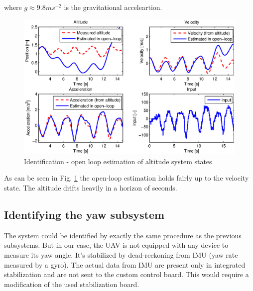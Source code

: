 where $g \approx 9.8 ms^{-2}$ is the gravitational acceleartion.

\begin{figure}[h]
\includegraphics[width=1\textwidth]{fig/iden4.eps} 
\caption{Identification - open loop estimation of altitude system states}
\label{fig:iden4}
\end{figure}

As can be seen in Fig. \ref{fig:iden4} the open-loop estimation holds fairly up to the velocity state. The altitude drifts heavily in a horizon of seconds. 

\subsection{Identifying the yaw subsystem}

The system could be identified by exactly the same procedure as the previous subsystems. But in our case, the UAV is not equipped with any device to measure its yaw angle. It's stabilized by dead-reckoning from IMU (yaw rate measured by a gyro). The actual data from IMU are present only in integrated stabilization and are not sent to the custom control board. This would require a modification of the used stabilization board.